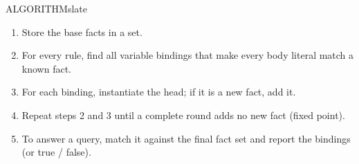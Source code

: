 \documentclass[11pt,a4paper]{article}
\newenvironment{algorithm}{\begin{secbox}{ALGORITHM}{slate}}{\end{secbox}}
\begin{document}
\begin{algorithm}
\begin{enumerate}
  \item Store the base facts in a set.
  \item For every rule, find all variable bindings that make every body literal match a known fact.
  \item For each binding, instantiate the head; if it is a new fact, add it.
  \item Repeat steps 2 and 3 until a complete round adds no new fact (fixed point).
  \item To answer a query, match it against the final fact set and report the bindings (or true / false).
\end{enumerate}
\end{algorithm}
\end{document}
